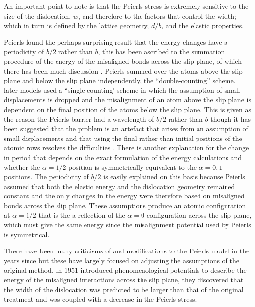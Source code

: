 An important point to note is that the Peierls stress is extremely sensitive to the size of the dislocation, $w$, and therefore to the factors that control the width; which in turn is defined by the lattice geometry, $d/b$, and the elastic properties.



Peierls found the perhaps surprising result that the energy changes have a periodicity of $b/2$ rather than $b$, this has been ascribed to the summation procedure of the energy of the misaligned bonds across the slip plane, of which there has been much discussion \cite{Hirth_Lothe1982lattice_periodicity,Lu2000peierls}. Peierls summed over the atoms above the slip plane and below the slip plane independently, the ``double-counting'' scheme, later models used a ``single-counting' scheme in which the assumption of small displacements is dropped and the misalignment of an atom above the slip plane is dependent on the final position of the atoms below the slip plane. This is given as the reason the Peierls barrier had a wavelength of $b/2$ rather than $b$ \cite{Hirth_Lothe1982lattice_periodicity,Lu2000peierls} though it has been suggested that the problem is an artefact that arises from an assumption of small displacements and that using the final rather than initial positions of the atomic rows resolves the difficulties \cite{Huntington1955}. There is another explanation for the change in period that depends on the exact formulation of the energy calculations and whether the $\alpha=1/2$ position is symmetrically equivalent to the $\alpha = 0, 1$ positions. The periodicity of $b/2$ is easily explained on this basis because Peierls assumed that both the elastic energy and the dislocation geometry remained constant and the only changes in the energy were therefore based on misaligned bonds across the slip plane. These assumptions produce an atomic configuration at $\alpha=1/2$ that is the a reflection  of the $\alpha=0$ configuration across the slip plane, which must give the same energy since the misalignment potential used by Peierls is symmetrical.




There have been many criticisms of and modifications to the Peierls model in the years since but these have largely focused on adjusting the assumptions of the original method.
In 1951 \citet{Foreman1951} introduced phenomenological potentials to describe the energy of the misaligned interactions across the slip plane, they discovered that the width of the dislocation was predicted to be larger than that of the original treatment and was coupled with a decrease in the Peierls stress.

